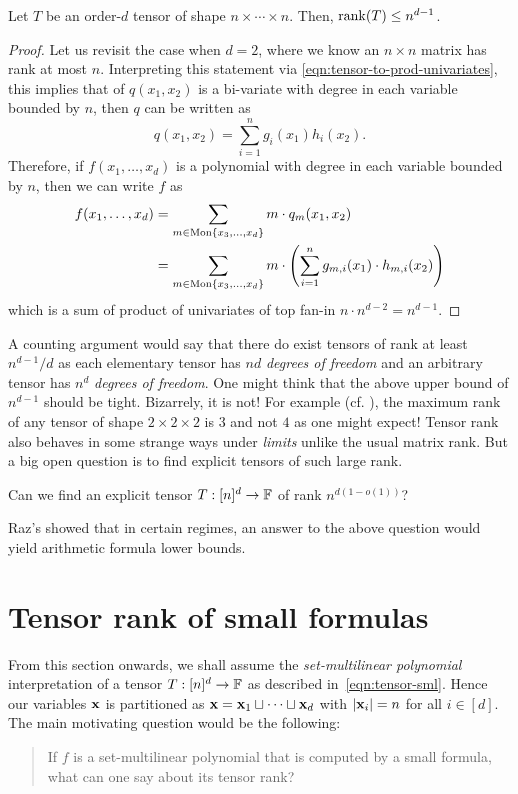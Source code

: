 \begin{lemma}\label{lem:tensor-rank-trivial-upperbound}
  Let $T$ be an order-$d$ tensor of shape $n\times \cdots \times n$.
Then, $\operatorname{rank}(T) \leq n^{d-1}$.
\end{lemma}
\begin{proof}
  Let us revisit the case when $d=2$, where we know an $n\times n$ matrix has rank at most $n$.
Interpreting this statement via \eqref{eqn:tensor-to-prod-univariates}, this implies that of $q(x_1,x_2)$ is a bi-variate with degree in each variable bounded by $n$, then $q$ can be written as
\[
q(x_1,x_2) = \sum_{i=1}^n g_i(x_1) h_i(x_2).
\]
Therefore, if $f(x_1,\ldots, x_d)$ is a polynomial with degree in each variable bounded by $n$, then we can write $f$ as
\begin{align*}
f(x_1,\ldots, x_d) &= \sum_{m \in \mathrm{Mon}\left\{x_3,\ldots, x_d\right\}} m \cdot q_m(x_1,x_2)\\
& = \sum_{m \in \mathrm{Mon}\left\{x_3,\ldots, x_d\right\}} m \cdot \left(\sum_{i=1}^n g_{m,i}(x_1) \cdot h_{m,i}(x_2)\right)
\end{align*}
which is a sum of product of univariates of top fan-in $n \cdot n^{d-2} = n^{d-1}$. 
\end{proof}

A counting argument would say that there do exist tensors of rank at least $n^{d-1}/d$ as each elementary tensor has $nd$ \emph{degrees of freedom} and an arbitrary tensor has $n^d$ \emph{degrees of freedom}.
One might think that the above upper bound of $n^{d-1}$ should be tight.
Bizarrely, it is not!
For example (cf.
\cite{p85}), the maximum rank of any tensor of shape $2\times 2 \times 2$ is $3$ and not $4$ as one might expect!
Tensor rank also behaves in some strange ways under \emph{limits} unlike the usual matrix rank.
But a big open question is to find explicit tensors of such large rank.

\begin{openproblem}
Can we find an explicit tensor $T: [n]^d \rightarrow \mathbb{F}$ of rank $n^{d(1 - o(1))}$?
\end{openproblem}

Raz's \cite{raz10} showed that in certain regimes, an answer to the above question would yield arithmetic formula lower bounds. 

\section{Tensor rank of small formulas}

From this section onwards, we shall assume the \emph{set-multilinear polynomial} interpretation of a tensor $T:[n]^d \rightarrow \mathbb{F}$ as described in~\eqref{eqn:tensor-sml}.
Hence our variables $\mathbf{x}$ is partitioned as $\mathbf{x} = \mathbf{x}_1 \sqcup \cdots \sqcup \mathbf{x}_d$ with $\left|\mathbf{x}_i\right| = n$ for all $i\in [d]$.
The main motivating question would be the following:
\begin{quote}
If $f$ is a set-multilinear polynomial that is computed by a small formula, what can one say about its tensor rank?
\end{quote}

